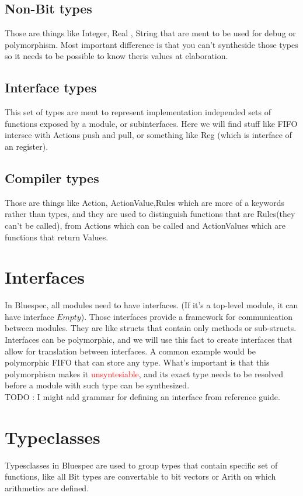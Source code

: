 \documentclass[14pt]{article}
\newcommand\todo[1]{\textcolor{red}{#1}}
\begin{document}
    \subsection{Non-Bit types}
        Those are things like Integer, Real , String that are ment to be used for debug or polymorphism. Most important difference is that you can't syntheside those types so it needs to be possible to know theris values at elaboration.
    \subsection{Interface types}
        This set of types are ment to represent implementation independed sets of functions exposed by a module, or subinterfaces. Here we will find stuff like FIFO intersce with Actions push and pull, or something like Reg (which is interface of an register).
    \subsection{Compiler types}
        Those are things like Action, ActionValue,Rules which are more of a keywords rather than types, and they are used to distinguish functions that are Rules(they can't be called), from Actions which can be called and ActionValues which are functions that return Values.

\section{Interfaces}
    In Bluespec, all modules need to have interfaces. (If it's a top-level module, it can have interface $Empty$). Those interfaces provide a framework for communication between modules. They are like structs that contain only methods or sub-structs. Interfaces can be polymorphic, and we will use this fact to create interfaces that allow for translation between interfaces. A common example would be polymorphic FIFO that can store any type. What's important is that this polymorphism makes it \todo{unsyntesiable}, and its exact type needs to be resolved before a module with such type can be synthesized.
    \\
    TODO : I might add grammar for defining an interface from reference guide.  

\section{Typeclasses}
    Typesclasses in Bluespec are used to group types that contain specific set of functions, like all Bit types are convertable to bit vectors or Arith on which arithmetics are defined.
\end{document}
